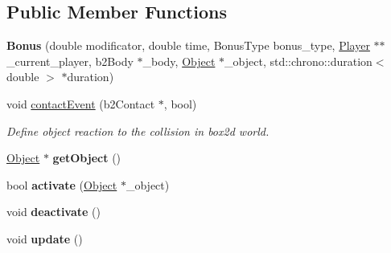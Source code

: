 \subsection*{Public Member Functions}
\begin{DoxyCompactItemize}
\item 
\mbox{\label{class_bonus_ac8581e33c82c8d6515b78ccffcf6f11b}} 
{\bfseries Bonus} (double modificator, double time, Bonus\+Type bonus\+\_\+type, \hyperlink{class_player}{Player} $\ast$$\ast$\+\_\+current\+\_\+player, b2\+Body $\ast$\+\_\+body, \hyperlink{class_object}{Object} $\ast$\+\_\+object, std\+::chrono\+::duration$<$ double $>$ $\ast$duration)
\item 
void \hyperlink{class_bonus_a903865168ff7fd91e0e2de23f849c553}{contact\+Event} (b2\+Contact $\ast$, bool)
\begin{DoxyCompactList}\small\item\em Define object reaction to the collision in box2d world. \end{DoxyCompactList}\item 
\mbox{\label{class_bonus_a5964466dfbb4b4e3e7d3eafcb9dae7db}} 
\hyperlink{class_object}{Object} $\ast$ {\bfseries get\+Object} ()
\item 
\mbox{\label{class_bonus_a78f64b402daa7593afb28b78baf6d15e}} 
bool {\bfseries activate} (\hyperlink{class_object}{Object} $\ast$\+\_\+object)
\item 
\mbox{\label{class_bonus_a52875b799a9937f5c398f8f95d9ead98}} 
void {\bfseries deactivate} ()
\item 
\mbox{\label{class_bonus_a40703fa50a436a844f0638557a175be0}} 
void {\bfseries update} ()
\end{DoxyCompactItemize}
